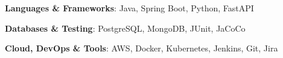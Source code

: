 \begin{cvempty} %
    \begin{cvitems} %
        \item{\textbf{Languages \& Frameworks}: Java, Spring Boot, Python, FastAPI}
        \item{\textbf{Databases \& Testing}: PostgreSQL, MongoDB, JUnit, JaCoCo}
        \item{\textbf{Cloud, DevOps \& Tools}: AWS, Docker, Kubernetes, Jenkins, Git, Jira}
    \end{cvitems}
\end{cvempty}

